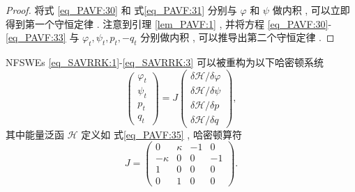 \begin{proof}
将式 \eqref{eq_PAVF:30} 和 式\eqref{eq_PAVF:31} 分别与 $\varphi$ 和 $\psi$ 做内积 , 可以立即得到第一个守恒定律 . 
注意到引理 \ref{lem_PAVF:1} , 并将方程 \eqref{eq_PAVF:30}-\eqref{eq_PAVF:33} 与 $\varphi_{t} , \psi_{t} , p_{t} , -q_{t}$ 分别做内积 , 可以推导出第二个守恒定律 . 
\end{proof}

\begin{theorem}\label{thm_PAVF:2}
	NFSWEs \eqref{eq_SAVRRK:1}-\eqref{eq_SAVRRK:3} 可以被重构为以下哈密顿系统
\begin{equation}\label{eq_PAVF:37}
	\left(\begin{array}{l}
		\varphi_{t} \\
		\psi_{t} \\
		p_{t} \\
		q_{t}
		\end{array}\right)=J\left(\begin{array}{l}
		\delta \mathcal{H} / \delta \varphi \\
		\delta \mathcal{H} / \delta \psi \\
		\delta \mathcal{H} / \delta p \\
		\delta \mathcal{H} / \delta q
		\end{array}\right) , 
\end{equation}
其中能量泛函 $\mathcal{H}$ 定义如 式\eqref{eq_PAVF:35} , 哈密顿算符
\begin{equation}\label{eq_PAVF:37b}
J=\left(\begin{array}{cccc}
		0 & \kappa & -1 & 0 \\
		-\kappa & 0 & 0 & -1 \\
		1 & 0 & 0 & 0 \\
		0 & 1 & 0 & 0
		\end{array}\right) . 
\end{equation}
\end{theorem}

